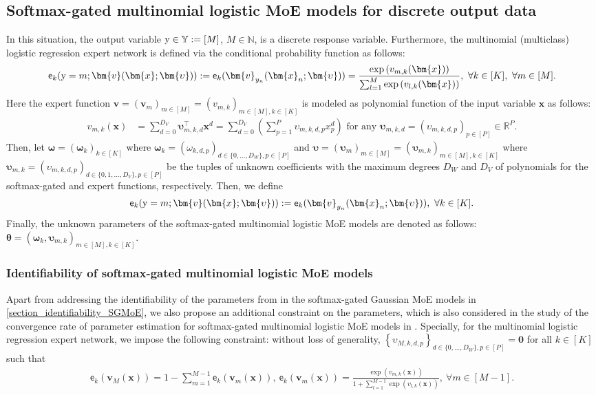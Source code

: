 \documentclass{article}
\newcommand{\mdg}{softmax-gated Gaussian MoE }
\newcommand{\mdm}{softmax-gated multinomial logistic MoE }
\newcommand{\Mdm}{Softmax-gated multinomial logistic MoE }
\newcommand{\zero}{\ensuremath{\mathbf{0}}}
\newcommand{\nn}{\nonumber} %
\def\ex{\mathsf{e}}
\def\ry{{\textnormal{y}}}
\def\vomega{{\bm{\omega}}}
\def\vupsilon{{\bm{\upsilon}}}
\def\evupsilon{\upsilon}
\def\vtheta{{\bm{\theta}}}
\def\vv{{\bm{v}}}
\def\vx{{\bm{x}}}
\def\evv{{v}}
\def\evx{{x}}
\def\sN{{\mathbb{N}}}
\def\sR{{\mathbb{R}}}
\def\sY{{\mathbb{Y}}}
\begin{document}
\subsection{\Mdm models for discrete output data} \label{sec_SMLMoE}
In this situation, the output variable $\ry \in \sY:= [M]$, $M \in \sN$, is a discrete response variable. Furthermore, the multinomial (multiclass) logistic regression expert network is defined via the conditional probability function as follows:
\begin{align*}
    \ex_k(\ry=m;\vv(\vx;\vupsilon)):=\ex_k(\vv_{y_n}(\vx_n;\vupsilon)) = \frac{\exp\left(\evv_{m,k}(\vx)\right)}{\sum_{l=1}^{M} \exp\left(\evv_{l,k}(\vx)\right)},~\forall k \in [K],~\forall m\in[M].
\end{align*}
Here the expert function $\vv=(\vv_m)_{m\in[M]}=(\evv_{m,k})_{m\in[M],k\in[K]}$ is modeled as polynomial function of the input variable $\vx$ as follows:
\begin{align}
	\evv_{m,k}(\vx) &= 
    \sum_{d=0}^{D_V}\vupsilon_{m,k,d}^\top \vx^d=\sum_{d=0}^{D_V}\left(\sum_{p=1}^{P}\upsilon_{m,k,d,p}\evx_p^d\right) \text{ for any $\vupsilon_{m,k,d} = (\evupsilon_{m,k,d,p})_{p\in[P]}\in \sR^P$}.\nn
\end{align}
Then, let $\vomega = \left(\vomega_k\right)_{k\in[K]}$ where $\vomega_k = \left(\omega_{k,d,p}\right)_{  d\in\{0,\ldots,D_W\},p\in [P]}$ and $\vupsilon=(\vupsilon_m)_{m\in[M]}=(\vupsilon_{m,k})_{m\in[M],k\in[K]}$ where $\vupsilon_{m,k} = \left(\evupsilon_{m,k,d,p}\right)_{d\in\{0,1,\ldots,D_V\},p\in [P]}$ be the tuples of unknown coefficients with the maximum degrees $D_{W}$ and $D_{V}$ of polynomials for the softmax-gated and expert functions, respectively. 
Then, we define 
\begin{align*}
	\ex_k(\ry=m;\vv(\vx;\vupsilon)):=\ex_k(\vv_{y_n}(\vx_n;\vupsilon)), ~\forall k \in [K].
\end{align*}
Finally, the unknown parameters of the \mdm models are denoted as follows: $\vtheta = \left(\vomega_k, \vupsilon_{m,k}\right)_{m\in[M],k \in [K]}.$

\subsubsection{Identifiability of \mdm models}
Apart from addressing the identifiability of the parameters from in the \mdg models in \cref{section_identifiability_SGMoE}, we also propose an additional constraint on the parameters, which is also considered in the study of the convergence rate of parameter estimation for \mdm models in \cite{nguyen_general_2024}. Specially, for the multinomial logistic regression expert network, we impose the following constraint: without loss of generality, $\left\{\evupsilon_{M,k,d,p}\right\}_{d\in\{0,\ldots,D_W\},p\in [P]} = \zero$ for all $k\in[K]$ such that
%
\begin{align*}
	  \ex_k\left(\vv_{M}(\vx)\right) = 1 - \sum_{m=1}^{M-1}\ex_k\left(\vv_{m}(\vx)\right), ~\ex_k\left(\vv_{m}(\vx)\right) =\frac{\exp\left(\evv_{m,k}(\vx)\right)}{1+\sum_{l=1}^{M-1} \exp\left(\evv_{l,k}(\vx)\right)}, ~\forall m \in [M-1].
\end{align*}
\end{document}
